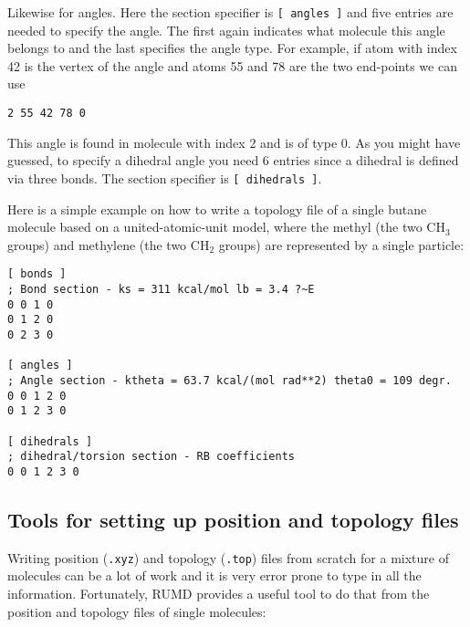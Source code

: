 \documentclass[a4paper]{article}
\begin{document}
Likewise for angles. Here the section specifier is \verb|[ angles ]|
and five entries are needed to specify the angle. The first again
indicates what molecule this angle belongs to and the last
specifies the angle type. For example, if
atom with index 42 is the vertex of the angle and atoms 55 and 78 are
the two end-points we can use
\begin{verbatim}
2 55 42 78 0
\end{verbatim}
This angle is found in molecule with index 2 and is of type 0. As you
might have guessed, to specify a dihedral angle you need 6 entries
since a dihedral is defined via three bonds. The section specifier is
\verb|[ dihedrals ]|.

Here is a simple example on how to write a topology file of a
single butane molecule based on a united-atomic-unit model,
where the methyl (the two $\mbox{CH}_3$ groups) and methylene
(the two $\mbox{CH}_2$ groups) are represented by a single particle:
\begin{verbatim}
[ bonds ]
; Bond section - ks = 311 kcal/mol lb = 3.4 ?~E
0 0 1 0
0 1 2 0
0 2 3 0

[ angles ]
; Angle section - ktheta = 63.7 kcal/(mol rad**2) theta0 = 109 degr.
0 0 1 2 0
0 1 2 3 0

[ dihedrals ]
; dihedral/torsion section - RB coefficients 
0 0 1 2 3 0
\end{verbatim}

\subsection{Tools for setting up position and topology files}
\label{sec:topology}

Writing position (\verb|.xyz|) and topology (\verb|.top|) files from scratch for a mixture of molecules can be a lot of
work and it is very error prone to type in all the
information. Fortunately, RUMD provides a useful tool to do that
from the position and topology files of single molecules:
\end{document}
